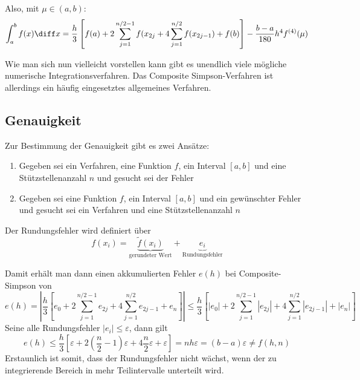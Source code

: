 Also, mit $\mu \in (a, b)$:
\begin{equation}
	\int_a^b f(x) \diff x = \frac{h}{3} \left[ f(a) + 2 \sum_{j = 1}^{n/2 - 1} f(x_{2j} + 4 \sum_{j = 1}^{n/2} f(x_{2j - 1}) + f(b) \right] - \frac{b - a}{180} h^4 f^{(4)}(\mu)
\end{equation}

Wie man sich nun vielleicht vorstellen kann gibt es unendlich viele mögliche numerische Integrationsverfahren. Das Composite Simpson-Verfahren ist allerdings ein häufig eingesetztes allgemeines Verfahren.

\subsection{Genauigkeit}
Zur Bestimmung der Genauigkeit gibt es zwei Ansätze:
\begin{enumerate}
	\item Gegeben sei ein Verfahren, eine Funktion $f$, ein Interval $[a, b]$ und eine Stützstellenanzahl $n$ und gesucht sei der Fehler
	\item Gegeben sei eine Funktion $f$, ein Interval $[a, b]$ und ein gewünschter Fehler und gesucht sei ein Verfahren und eine Stützstellenanzahl $n$
\end{enumerate}

Der Rundungsfehler wird definiert über
\begin{equation}
	f(x_i) = \underbrace{\tilde{f}(x_i)}_{\text{gerundeter Wert}} + \underbrace{e_i}_{\text{Rundungsfehler}}
\end{equation}

Damit erhält man dann einen akkumulierten Fehler $e(h)$ bei Composite-Simpson von
\begin{equation}
	e(h) = \left| \frac{h}{3} \left[ e_0 + 2 \sum_{j = 1}^{n/2 - 1} e_{2j} + 4 \sum_{j = 1}^{n/2} e_{2j - 1} + e_n \right] \right| \le \frac{h}{3} \left[ |e_0| + 2 \sum_{j = 1}^{n/2 - 1} |e_{2j}| + 4 \sum_{j = 1}^{n/2} |e_{2j - 1}| + |e_n| \right]
\end{equation}
Seine alle Rundungsfehler $|e_i| \le \varepsilon$, dann gilt
\begin{equation}
	e(h) \le \frac{h}{3} \left[ \varepsilon + 2(\frac{n}{2} - 1) \varepsilon + 4 \frac{n}{2} \varepsilon + \varepsilon \right] = n h \varepsilon = (b - a) \varepsilon \ne f(h, n)
\end{equation}
Erstaunlich ist somit, dass der Rundungsfehler nicht wächst, wenn der zu integrierende Bereich in mehr Teilintervalle unterteilt wird.

